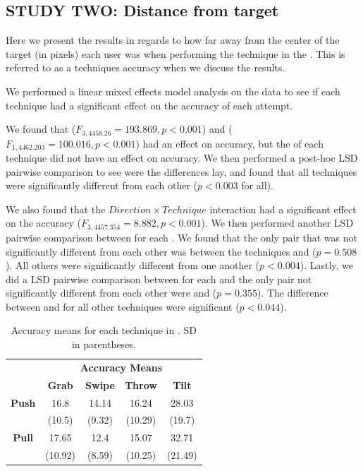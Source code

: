 \subsection{STUDY TWO: Distance from target}
Here we present the results in regards to how far away from the center of the target (in pixels) each user was when performing the technique in the \accuracy. 
This is referred to as a techniques accuracy when we discuss the results. 

We performed a linear mixed effects model analysis on the data to see if each technique had a significant effect on the accuracy of each attempt. 

We found that \technique ($F_{3,4458.26}=193.869, p<0.001$) and \targetsize ($F_{1,4462.203}=100.016, p<0.001$) had an effect on accuracy, but the \direction of each technique did not have an effect on accuracy. 
We then performed a post-hoc LSD pairwise comparison to see were the differences lay, and found that all techniques were significantly different from each other ($p<0.003$ for all).

We also found that the $Direction \times Technique$ interaction had a significant effect on the accuracy ($F_{3,4457.354}=8.882, p<0.001$).
We then performed another LSD pairwise comparison between \technique for each \direction. 
We found that the only pair that was not significantly different from each other was between the techniques \grab \push and \throw \push ($p=0.508$). 
All others were significantly different from one another ($p<0.004$). 
Lastly, we did a LSD pairwise comparison between \direction for each \technique and the only pair not significantly different from each other were \grab \push and \grab \pull ($p=0.355$).
The difference between \pull and \push for all other techniques were significant ($p<0.044$).

\begin{table}[H]
	\centering
	\def\arraystretch{1}
		\begin{tabular}{c c c c c}
			& \multicolumn{4}{c}{\textbf{Accuracy Means}} \B \\
			\cline{2-5}
			& \textbf{Grab} & \textbf{Swipe} & \textbf{Throw} & \textbf{Tilt} \T\B \\ \hline
			\textbf{Push} & 16.8 & 14.14 & 16.24 & 28.03 \T \\ 
			& (10.5) & (9.32) & (10.29) & (19.7) \B \\ \hline
			\textbf{Pull} & 17.65 & 12.4 & 15.07 & 32.71 \T \\
			& (10.92) & (8.59) & (10.25) & (21.49) \B \\ \hline
		\end{tabular}
	\caption{Accuracy means for each technique in \accuracy. SD in parentheses.}
	\label{tab:successRate}
\end{table}

